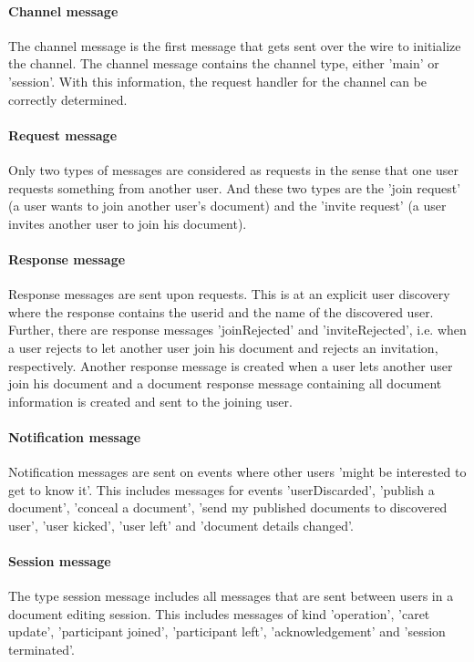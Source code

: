 \paragraph{Channel message}
The channel message is the first message that gets sent over the wire to initialize the channel. The channel message contains the channel type, either 'main' or 'session'. With this information, the request handler for the channel can be correctly determined.

\paragraph{Request message}
Only two types of messages are considered as requests in the sense that one user requests something from another user. And these two types are the 'join request' (a user wants to join another user's document) and the 'invite request' (a user invites another user to join his document).

\paragraph{Response message}
Response messages are sent upon requests. This is at an explicit user discovery where the response contains the userid and the name of the discovered user. Further, there are response messages 'joinRejected' and 'inviteRejected', i.e. when a user rejects to let another user join his document and rejects an invitation, respectively. Another response message is created when a user lets another user join his document and a document response message containing all document information is created and sent to the joining user.

\paragraph{Notification message}
Notification messages are sent on events where other users 'might be interested to get to know it'. This includes messages for events 'userDiscarded', 'publish a document', 'conceal a document', 'send my published documents to discovered user', 'user kicked', 'user left' and 'document details changed'.

\paragraph{Session message}
The type session message includes all messages that are sent between users in a document editing session. This includes messages of kind 'operation', 'caret update', 'participant joined', 'participant left', 'acknowledgement' and 'session terminated'.


